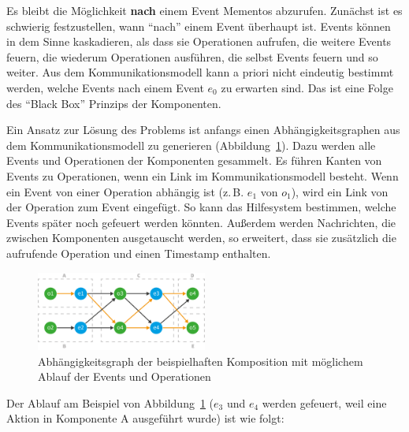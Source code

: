 \documentclass[
	headsepline,
	footsepline,
	fontsize=12pt,
	bibliography=totoc
]{scrbook}
\begin{document}

Es bleibt die Möglichkeit \textbf{nach} einem Event Mementos abzurufen. Zunächst ist es schwierig festzustellen, wann \enquote{nach} einem Event überhaupt ist. Events können in dem Sinne kaskadieren, als dass sie Operationen aufrufen, die weitere Events feuern, die wiederum Operationen ausführen, die selbst Events feuern und so weiter. Aus dem Kommunikationsmodell kann a priori nicht eindeutig bestimmt werden, welche Events nach einem Event $e_0$ zu erwarten sind. Das ist eine Folge des \enquote{Black Box} Prinzips der Komponenten.


Ein Ansatz zur Lösung des Problems ist anfangs einen Abhängigkeitsgraphen aus dem Kommunikationsmodell zu generieren (Abbildung~\ref{figure:dependency-graph}). Dazu werden alle Events und Operationen der Komponenten gesammelt. Es führen Kanten von Events zu Operationen, wenn ein Link im Kommunikationsmodell besteht. Wenn ein Event von einer Operation abhängig ist (z.\,B. $e_1$ von $o_1$), wird ein Link von der Operation zum Event eingefügt. So kann das Hilfesystem bestimmen, welche Events später noch gefeuert werden könnten. Außerdem werden Nachrichten, die zwischen Komponenten ausgetauscht werden, so erweitert, dass sie zusätzlich die aufrufende Operation und einen Timestamp enthalten.

\begin{figure}[htbp]
   \centering
   \includegraphics[width=0.5\textwidth]{images/konzeption-dependency-graph.png}
   \caption{Abhängigkeitsgraph der beispielhaften Komposition mit möglichem Ablauf der Events und Operationen}
   \label{figure:dependency-graph}
\end{figure}


Der Ablauf am Beispiel von Abbildung~\ref{figure:dependency-graph} ($e_3$ und $e_4$ werden gefeuert, weil eine Aktion in Komponente A ausgeführt wurde) ist wie folgt:
\end{document}
